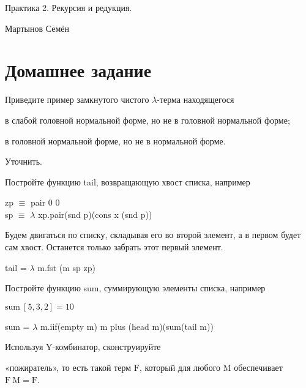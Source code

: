\documentclass[a4paper,12pt]{article} %
\begin{document}
\begin{flushright}
Практика 2. Рекурсия и редукция.

Мартынов Семён

\hrulefill
\end{flushright}

\section{Домашнее задание}

\begin{enumerate}

{\item Приведите пример замкнутого чистого $\lambda$-терма находящегося
	\begin{itemize}%
		{\item в слабой головной нормальной форме, но не в головной нормальной форме;}
		{\item в головной нормальной форме, но не в нормальной форме.}
	\end{itemize}%
}

Уточнить.





{\item Постройте функцию tail, возвращающую хвост списка, например}

zp $\equiv$ pair 0 0 \\
sp $\equiv$ $\lambda$ xp.pair(snd p)(cons x (snd p))

Будем двигаться по списку, складывая его во второй элемент, а в первом будет сам хвост. Останется только забрать этот первый элемент.

tail = $\lambda$ m.fst (m sp zp)

{\item Постройте функцию sum, суммирующую элементы списка, например
	\begin{center}
		$\mathrm{sum \ [5,3,2] = 10}$
	\end{center}
}

sum = $\lambda$ m.iif(empty m) m plus (head m)(sum(tail m))


{\item Используя $\bm{\mathrm{Y}}$-комбинатор, сконструируйте}
	\begin{itemize}%
		{\item «пожиратель», то есть такой терм $\mathrm{F}$, который для любого $\mathrm{M}$ обеспечивает $\mathrm{F \ M = F}$.}


\end{itemize}
\end{enumerate}
\end{document}
